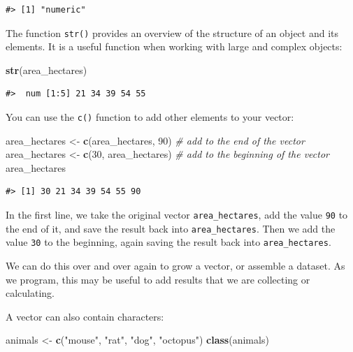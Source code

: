 \documentclass[
]{book}
\newenvironment{Shaded}{\begin{snugshade}}{\end{snugshade}}
\newcommand{\CommentTok}[1]{\textcolor[rgb]{0.56,0.35,0.01}{\textit{#1}}}
\newcommand{\DecValTok}[1]{\textcolor[rgb]{0.00,0.00,0.81}{#1}}
\newcommand{\FunctionTok}[1]{\textcolor[rgb]{0.13,0.29,0.53}{\textbf{#1}}}
\newcommand{\NormalTok}[1]{#1}
\newcommand{\OtherTok}[1]{\textcolor[rgb]{0.56,0.35,0.01}{#1}}
\newcommand{\StringTok}[1]{\textcolor[rgb]{0.31,0.60,0.02}{#1}}
\begin{document}
\begin{verbatim}
#> [1] "numeric"
\end{verbatim}

The function \texttt{str()} provides an overview of the structure of an object and its
elements. It is a useful function when working with large and complex
objects:

\begin{Shaded}
\begin{Highlighting}[]
\FunctionTok{str}\NormalTok{(area\_hectares)}
\end{Highlighting}
\end{Shaded}

\begin{verbatim}
#>  num [1:5] 21 34 39 54 55
\end{verbatim}

You can use the \texttt{c()} function to add other elements to your vector:

\begin{Shaded}
\begin{Highlighting}[]
\NormalTok{area\_hectares }\OtherTok{\textless{}{-}} \FunctionTok{c}\NormalTok{(area\_hectares, }\DecValTok{90}\NormalTok{) }\CommentTok{\# add to the end of the vector}
\NormalTok{area\_hectares }\OtherTok{\textless{}{-}} \FunctionTok{c}\NormalTok{(}\DecValTok{30}\NormalTok{, area\_hectares) }\CommentTok{\# add to the beginning of the vector}
\NormalTok{area\_hectares}
\end{Highlighting}
\end{Shaded}

\begin{verbatim}
#> [1] 30 21 34 39 54 55 90
\end{verbatim}

In the first line, we take the original vector \texttt{area\_hectares},
add the value \texttt{90} to the end of it, and save the result back into
\texttt{area\_hectares}. Then we add the value \texttt{30} to the beginning, again saving the result back into \texttt{area\_hectares}.

We can do this over and over again to grow a vector, or assemble a dataset.
As we program, this may be useful to add results that we are collecting or
calculating.

A vector can also contain characters:

\begin{Shaded}
\begin{Highlighting}[]
\NormalTok{animals }\OtherTok{\textless{}{-}} \FunctionTok{c}\NormalTok{(}\StringTok{"mouse"}\NormalTok{, }\StringTok{"rat"}\NormalTok{, }\StringTok{"dog"}\NormalTok{, }\StringTok{"octopus"}\NormalTok{)}
\FunctionTok{class}\NormalTok{(animals)}
\end{Highlighting}
\end{Shaded}
\end{document}
